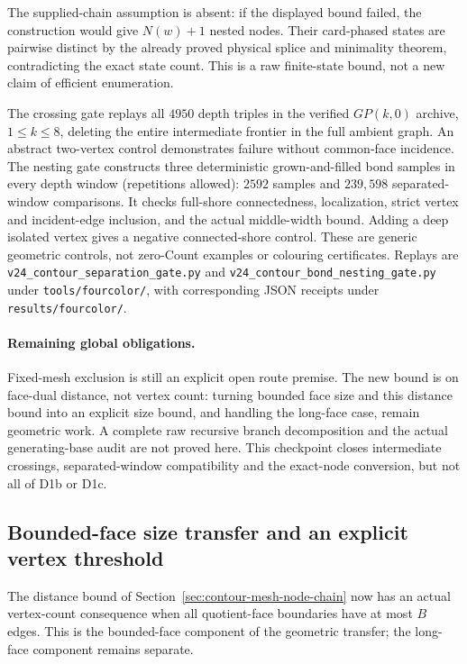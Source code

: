 The supplied-chain assumption is absent: if the displayed bound failed,
the construction would give $N(w)+1$ nested nodes.  Their card-phased
states are pairwise distinct by the already proved physical splice and
minimality theorem, contradicting the exact state count.  This is a raw
finite-state bound, not a new claim of efficient enumeration.

The crossing gate replays all $4950$ depth triples in the verified
$GP(k,0)$ archive, $1\le k\le8$, deleting the entire intermediate
frontier in the full ambient graph.  An abstract two-vertex control
demonstrates failure without common-face incidence.  The nesting gate
constructs three deterministic grown-and-filled bond samples in every depth
window (repetitions allowed): $2592$ samples and $239{,}598$ separated-window comparisons.  It
checks full-shore connectedness, localization, strict vertex and
incident-edge inclusion, and the actual middle-width bound.  Adding a
deep isolated vertex gives a negative connected-shore control.  These are
generic geometric controls, not zero-Count examples or colouring
certificates.  Replays are
\texttt{v24\_contour\_separation\_gate.py} and
\texttt{v24\_contour\_bond\_nesting\_gate.py} under
\texttt{tools/fourcolor/}, with corresponding JSON receipts under
\texttt{results/fourcolor/}.

\paragraph{Remaining global obligations.}
Fixed-mesh exclusion is still an explicit open route premise.  The new
bound is on face-dual distance, not vertex count: turning bounded face
size and this distance bound into an explicit size bound, and handling
the long-face case, remain geometric work.  A complete raw recursive
branch decomposition and the actual generating-base audit are not proved
here.  This checkpoint closes intermediate crossings, separated-window
compatibility and the exact-node conversion, but not all of D1b or D1c.
\subsection{Bounded-face size transfer and an explicit vertex threshold}
\label{sec:bounded-face-size-transfer}

The distance bound of Section~\ref{sec:contour-mesh-node-chain} now has
an actual vertex-count consequence when all quotient-face boundaries have
at most $B$ edges.  This is the bounded-face component of the geometric
transfer; the long-face component remains separate.

